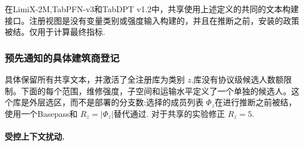 在LimiX-2M,TabPFN-v3和TabDPT v1.2中，共享使用上述定义的共同的文本构建接口。注册视图是没有变量类别或强度输入构建的，并且在推断之前，安装的政策被结。仅用于计算最终指标.

\subsubsection{预先通知的具体建筑商登记}

具体保留所有共享文本，并激活了全注册库为类别 $z$.库没有协议级候选人数额限制。下面的每个范围，维修强度，子空间和运输水平定义了一个单独的候选人。这个库是外层选区，而不是部署的分支数:选择的成员列表 $\Phi_z$在进行推断之前被结，使用一个Basepass和 $R_z=|\Phi_z|$替代通过.
对于共享的实验修正 $R_z=5$.

\paragraph{受控上下文扰动.}
\begingroup
  \footnotesize
  \setlength{\LTpre}{0.45\baselineskip}
  \setlength{\LTpost}{0.45\baselineskip}
